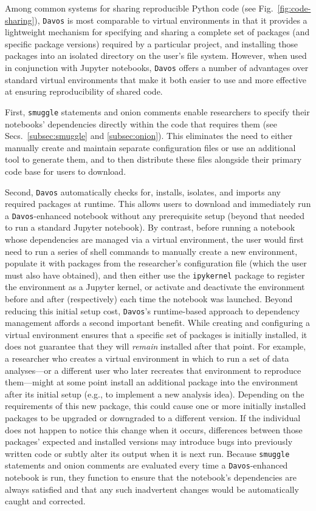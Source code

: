\documentclass[preprint,12pt,a4paper]{elsarticle}
\begin{document}
Among common systems for sharing reproducible Python code (see Fig.~\ref{fig:code-sharing}), \texttt{Davos} is most comparable to virtual environments in that it provides a lightweight mechanism for specifying and sharing a complete set of packages (and specific package versions) required by a particular project, and installing those packages into an isolated directory on the user's file system.
However, when used in conjunction with Jupyter notebooks, \texttt{Davos} offers a number of advantages over standard virtual environments that make it both easier to use and more effective at ensuring reproducibility of shared code.

First, \texttt{smuggle} statements and onion comments enable researchers to specify their notebooks' dependencies directly within the code that requires them (see Secs.~\ref{subsec:smuggle} and  \ref{subsec:onion}).
This eliminates the need to either manually create and maintain separate configuration files or use an additional tool to generate them, and to then distribute these files alongside their primary code base for users to download.

Second, \texttt{Davos} automatically checks for, installs, isolates, and imports any required packages at runtime.
This allows users to download and immediately run a \texttt{Davos}-enhanced notebook without any prerequisite setup (beyond that needed to run a standard Jupyter notebook).
By contrast, before running a notebook whose dependencies are managed via a virtual environment, the user would first need to run a series of shell commands to manually create a new environment, populate it with packages from the researcher's configuration file (which the user must also have obtained), and then either use the \texttt{ipykernel} package to register the environment as a Jupyter kernel, or activate and deactivate the environment before and after (respectively) each time the notebook was launched.
Beyond reducing this initial setup cost, \texttt{Davos}'s runtime-based approach to dependency management affords a second important benefit.
While creating and configuring a virtual environment ensures that a specific set of packages is initially installed, it does not guarantee that they will \textit{remain} installed after that point.
For example, a researcher who creates a virtual environment in which to run a set of data analyses---or a different user who later recreates that environment to reproduce them---might at some point install an additional package into the environment after its initial setup (e.g., to implement a new analysis idea).
Depending on the requirements of this new package, this could cause one or more initially installed packages to be upgraded or downgraded to a different version.
If the individual does not happen to notice this change when it occurs, differences between those packages' expected and installed versions may introduce bugs into previously written code or subtly alter its output when it is next run.
Because \texttt{smuggle} statements and onion comments are evaluated every time a \texttt{Davos}-enhanced notebook is run, they function to ensure that the notebook's dependencies are always satisfied and that any such inadvertent changes would be automatically caught and corrected.
\end{document}
